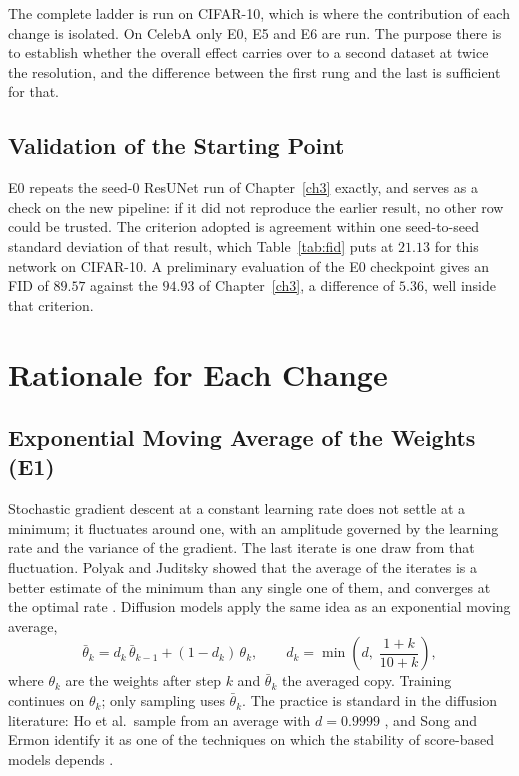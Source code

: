 The complete ladder is run on CIFAR-10, which is where the contribution of each change is isolated.
On CelebA only E0, E5 and E6 are run. The purpose there is to establish whether the overall effect
carries over to a second dataset at twice the resolution, and the difference between the first rung
and the last is sufficient for that.

\subsection{Validation of the Starting Point}

E0 repeats the seed-0 ResUNet run of Chapter~\ref{ch3} exactly, and serves as a check on the new
pipeline: if it did not reproduce the earlier result, no other row could be trusted. The criterion
adopted is agreement within one seed-to-seed standard deviation of that result, which
Table~\ref{tab:fid} puts at $21.13$ for this network on CIFAR-10. A preliminary evaluation of the E0
checkpoint gives an FID of $89.57$ against the $94.93$ of Chapter~\ref{ch3}, a difference of $5.36$,
well inside that criterion.

\section{Rationale for Each Change}
\label{sec:ext-rationale}

\subsection{Exponential Moving Average of the Weights (E1)}
\label{sec:ext-ema}

Stochastic gradient descent at a constant learning rate does not settle at a minimum; it fluctuates
around one, with an amplitude governed by the learning rate and the variance of the gradient. The
last iterate is one draw from that fluctuation. Polyak and Juditsky showed that the average of the
iterates is a better estimate of the minimum than any single one of them, and converges at the
optimal rate \parencite{polyak1992averaging}. Diffusion models apply the same idea as an exponential
moving average,
\begin{equation}
    \bar\theta_k = d_k\,\bar\theta_{k-1} + (1 - d_k)\,\theta_k,
    \qquad d_k = \min\!\left(d,\; \frac{1 + k}{10 + k}\right),
    \label{eq:ext-ema}
\end{equation}
where $\theta_k$ are the weights after step $k$ and $\bar\theta_k$ the averaged copy. Training
continues on $\theta_k$; only sampling uses $\bar\theta_k$. The practice is standard in the
diffusion literature: Ho et al.\ sample from an average with $d = 0.9999$
\parencite{arXiv:2006.11239}, and Song and Ermon identify it as one of the techniques on which the
stability of score-based models depends \parencite{arXiv:2006.09011}.

